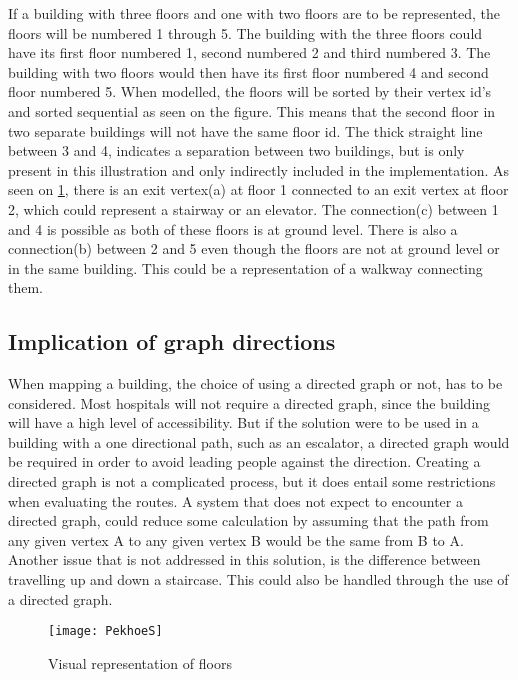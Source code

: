 If a building with three floors and one with two floors are to be represented, the floors will be numbered 1 through 5. The building with the three floors could have its first floor numbered 1, second numbered 2 and third numbered 3. The building with two floors would then have its first floor numbered 4 and second floor numbered 5. When modelled, the floors will be sorted by their vertex id's and sorted sequential as seen on the figure. This means that the second floor in two separate buildings will not have the same floor id. The thick straight line between 3 and 4, indicates a separation between two buildings, but is only present in this illustration and only indirectly included in the implementation. As seen on \cref{fig:PekhoeS}, there is an exit vertex(a) at floor 1 connected to an exit vertex at floor 2, which could represent a stairway or an elevator. The connection(c) between 1 and 4 is possible as both of these floors is at ground level. There is also a connection(b) between 2 and 5 even though the floors are not at ground level or in the same building. This could be a representation of a walkway connecting them.

\subsection{Implication of graph directions}

When mapping a building, the choice of using a directed graph or not, has to be considered. Most hospitals will not require a directed graph, since the building will have a high level of accessibility. But if the solution were to be used in a building with a one directional path, such as an escalator, a directed graph would be required in order to avoid leading people against the direction. Creating a directed graph is not a complicated process, but it does entail some restrictions when evaluating the routes. A system that does not expect to encounter a directed graph, could reduce some calculation by assuming that the path from any given vertex A to any given vertex B would be the same from B to A. Another issue that is not addressed in this solution, is the difference between travelling up and down a staircase. This could also be handled through the use of a directed graph.


\begin{figure}[ht!]
    \centering
    \texttt{[image: PekhoeS]}
    \caption{Visual representation of floors}
    \label{fig:PekhoeS}
  \end{figure}



